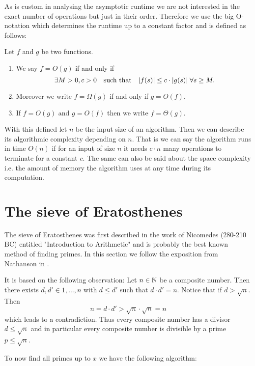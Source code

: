 As is custom in analysing the asymptotic runtime we are not interested in the exact
number of operations but just in their order. Therefore we use the big O-notation
which determines the runtime up to a constant factor and is defined as follows:
\begin{definition}
	Let $f$ and $g$ be two functions.
	\begin{enumerate}
		\item We say $f = O(g)$ if and only if
			\[
				\exists M > 0, c > 0 \qq{such that} \abs{f(s)} \leq c \cdot  \abs{g(s)} \forall s \geq M
			.\] 
		\item Moreover we write $f = \Omega(g)$ if and only if $g = O(f)$. 
		\item If $f = O(g)$ and $g = O(f)$ then we write $f = \Theta(g)$.
	\end{enumerate}
\end{definition}
With this defined let $n$ be the input size of an algorithm.
Then we can describe its algorithmic complexity depending on $n$. 
That is we can say the algorithm runs in time $O(n)$ if for an input of size $n$ it needs
$c \cdot n$ many operations to terminate for a constant $c$.
The same can also be said about the space complexity i.e. the amount of memory the algorithm uses at any time during its computation.


\section{The sieve of Eratosthenes}
\label{sec:eratosthenes}
The sieve of Eratosthenes was first described in the work of Nicomedes (280-210 BC) entitled "Introduction to Arithmetic" and is probably 
the best known method of finding primes. In this section we follow the exposition from Nathanson in \cite{nathanson00}.

It is based on the following observation: Let $n \in \mathbb{N}$ be a composite number. Then there exists $d, d' \in {1,\ldots,n}$ with $d \leq d'$ such that 
$d \cdot d' = n$. Notice that if $d > \sqrt{n}$. Then
\[
n = d \cdot  d' > \sqrt{n} \cdot \sqrt{n} = n
\] 
which leads to a contradiction.
Thus every composite number has a divisor $d \leq \sqrt{n}$ and in particular every composite number is divisible by a prime $p \leq \sqrt{n}$.

To now find all primes up to $x$ we have the following algorithm:

